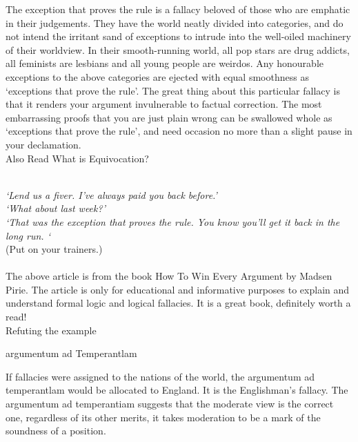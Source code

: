 \documentclass[a4paper,12pt,single,pdftex]{scrartcl}
\begin{document}
    
      The exception that proves the rule is a fallacy beloved of those who are emphatic in their judgements. They have the world neatly divided into categories, and do not intend the irritant sand of exceptions to intrude into the well-oiled machinery of their worldview. In their smooth-running world, all pop stars are drug addicts, all feminists are lesbians and all young people are weirdos. Any honourable exceptions to the above categories are ejected with equal smoothness as ‘exceptions that prove the rule’. The great thing about this particular fallacy is that it renders your argument invulnerable to factual correction. The most embarrassing proofs that you are just plain wrong can be swallowed whole as ‘exceptions that prove the rule’, and need occasion no more than a slight pause in your declamation.
    \\

    
      

      
        Also Read  What is Equivocation?
      
    
    
       
    \\

    
      {\em ‘Lend us a fiver. I’ve always paid you back before.’ }
    \\

    
      {\em ‘What about last week?’}
    \\

    
      {\em ‘That was the exception that proves the rule. You know you’ll get it back in the long run. ‘}
    \\

    
      (Put on your trainers.)
    \\

    
       
    \\

    
      The above article is from the book How To Win Every Argument by Madsen Pirie. The article is only for educational and informative purposes to explain and understand formal logic and logical fallacies. It is a great book, definitely worth a read!
    \\

  

Refuting the example

argumentum ad Temperantlam
    
      If fallacies were assigned to the nations of the world, the argumentum ad temperantlam would be allocated to England. It is the Englishman’s fallacy. The argumentum ad temperantiam suggests that the moderate view is the correct one, regardless of its other merits, it takes moderation to be a mark of the soundness of a position.
    \\
\end{document}
